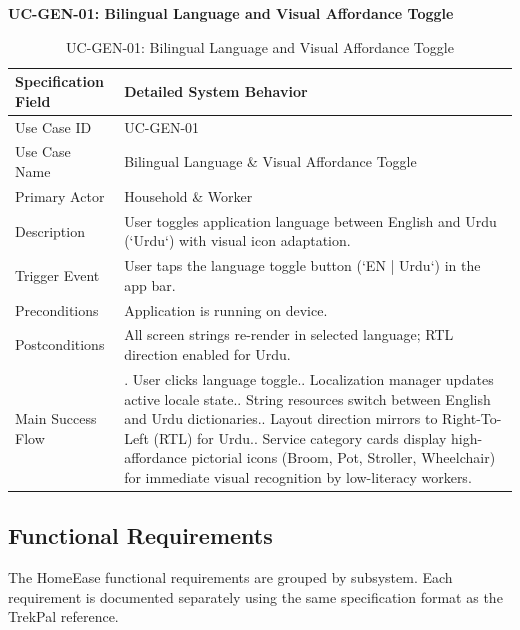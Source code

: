 \documentclass[12pt,a4paper]{article}
\newcommand{\urduword}{Urdu}
\newcommand{\urduword}{Urdu}
\begin{document}
\endgroup
\clearpage
\noindent\textbf{UC-GEN-01: Bilingual Language and Visual Affordance Toggle}\par
\vspace{4pt}
\begingroup\small\setlength{\tabcolsep}{3pt}\renewcommand{\arraystretch}{1.15}
\begin{longtable}{|>{\raggedright\arraybackslash}p{\dimexpr(\linewidth-4\tabcolsep-3\arrayrulewidth)/2\relax}|>{\raggedright\arraybackslash}p{\dimexpr(\linewidth-4\tabcolsep-3\arrayrulewidth)/2\relax}|}
\caption{UC-GEN-01: Bilingual Language and Visual Affordance Toggle}\label{tab:uc-gen-01}\\
\hline
Specification Field & Detailed System Behavior \\ \hline
Use Case ID & UC-GEN-01 \\ \hline
Use Case Name & Bilingual Language \& Visual Affordance Toggle \\ \hline
Primary Actor & Household \& Worker \\ \hline
Description & User toggles application language between English and Urdu (`\urduword`) with visual icon adaptation. \\ \hline
Trigger Event & User taps the language toggle button (`EN | \urduword`) in the app bar. \\ \hline
Preconditions & Application is running on device. \\ \hline
Postconditions & All screen strings re-render in selected language; RTL direction enabled for Urdu. \\ \hline
Main Success Flow & 1. User clicks language toggle.\newline 2. Localization manager updates active locale state.\newline 3. String resources switch between English and Urdu dictionaries.\newline 4. Layout direction mirrors to Right-To-Left (RTL) for Urdu.\newline 5. Service category cards display high-affordance pictorial icons (Broom, Pot, Stroller, Wheelchair) for immediate visual recognition by low-literacy workers. \\ \hline
\end{longtable}
\endgroup
\clearpage
\subsection{Functional Requirements}
The HomeEase functional requirements are grouped by subsystem. Each requirement is documented separately using the same specification format as the TrekPal reference.
\end{document}

